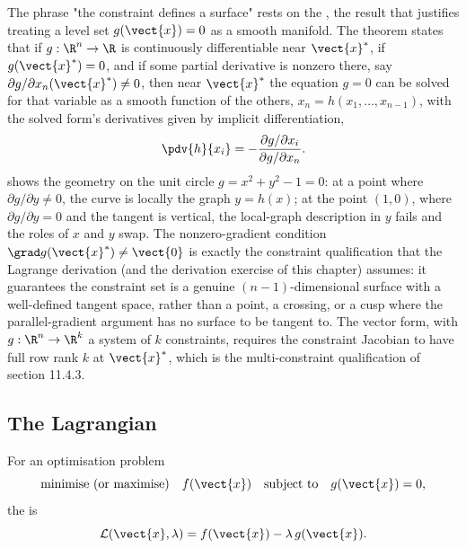 \begin{mastery}
The phrase "the constraint defines a surface" rests on the
, the result that justifies
treating a level set $g(\vect{x}) = 0$ as a smooth manifold. The
theorem states that if $g : \R^{n} \to \R$ is continuously
differentiable near $\vect{x}^{*}$, if $g(\vect{x}^{*}) = 0$, and if
some partial derivative is nonzero there, say $\partial g/\partial
x_{n}(\vect{x}^{*}) \neq 0$, then near $\vect{x}^{*}$ the equation
$g = 0$ can be solved for that variable as a smooth function of the
others, $x_{n} = h(x_{1}, \ldots, x_{n - 1})$, with the solved form's
derivatives given by implicit differentiation,
\[
\pdv{h}{x_{i}} = -\frac{\partial g/\partial x_{i}}
{\partial g/\partial x_{n}}.
\]
 shows the geometry on the
unit circle $g = x^{2} + y^{2} - 1 = 0$: at a point where
$\partial g/\partial y \neq 0$, the curve is locally the graph
$y = h(x)$; at the point $(1, 0)$, where $\partial g/\partial y = 0$
and the tangent is vertical, the local-graph description in $y$
fails and the roles of $x$ and $y$ swap. The nonzero-gradient
condition $\grad g(\vect{x}^{*}) \neq \vect{0}$ is exactly the
constraint qualification that the Lagrange derivation (and the
derivation exercise of this chapter) assumes: it guarantees the
constraint set is a genuine $(n - 1)$-dimensional surface with a
well-defined tangent space, rather than a point, a crossing, or a
cusp where the parallel-gradient argument has no surface to be
tangent to. The vector form, with $g : \R^{n} \to \R^{k}$ a system
of $k$ constraints, requires the constraint Jacobian to have full
row rank $k$ at $\vect{x}^{*}$, which is the multi-constraint
qualification of section 11.4.3.
\end{mastery}



\subsection{The Lagrangian}

\begin{definition}[Lagrangian]
For an optimisation problem
\[
\text{minimise (or maximise)}\quad f(\vect{x})\quad
\text{subject to}\quad g(\vect{x}) = 0,
\]
the  is
\[
\mathcal{L}(\vect{x}, \lambda) = f(\vect{x}) - \lambda\,g(\vect{x}).
\]
\end{definition}

